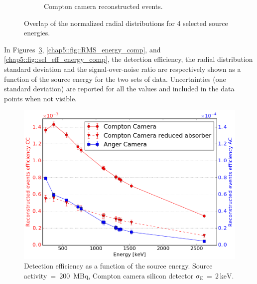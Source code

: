 \begin{figure}
\begin{subfigure}{.5\textwidth}
  \caption{Compton camera reconstructed events.}
  \label{chap5::fig::rad_distr_overlap_CC}
\end{subfigure}
\caption{Overlap of the normalized radial distributions for 4 selected source energies.}
\label{chap5::fig::rad_distr_overlap}
\end{figure} 
               
In Figures~\ref{chap5::fig::eff_energy_comp}, \ref{chap5::fig::RMS_energy_comp}, and \ref{chap5::fig::sel_eff_energy_comp}, the detection efficiency, the radial distribution standard deviation and the signal-over-noise ratio are respectively shown as a function of the source energy for the two sets of data. Uncertainties (one standard deviation) are reported for all the values and included in the data points when not visible.


\begin{figure}[h!]
\begin{center}
\hspace{0.4cm} \includegraphics[scale=0.4]{03_GraphicFiles/chapter5_SPECTsimu/SPECT/comparison/reduced_absorber/effVSenergy_overlap}
\caption{Detection efficiency as a function of the source energy. Source activity~=~200~MBq, Compton camera silicon detector $\mathrm{\sigma_{E}\,=\,2\,keV}$.}
\label{chap5::fig::eff_energy_comp}
\end{center}
\end{figure}

